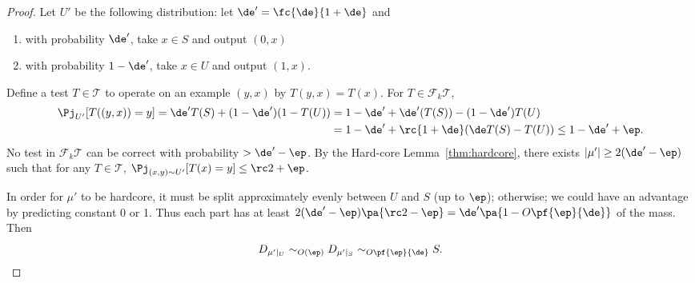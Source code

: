 \begin{proof}
Let $U'$ be the following distribution: let $\de'=\fc{\de}{1+\de}$ and 
\begin{enumerate}
\item
with probability $\de'$, take $x\in S$ and output $(0,x)$
\item
with probability $1-\de'$, take $x\in U$ and output $(1,x)$.
\end{enumerate}
Define a test $T\in \mathcal T$ to operate on an example $(y, x)$ by $T(y,x)=T(x)$. For $T\in \mathcal F_k \mathcal T$, 
\begin{align}
\Pj_{U'}[T((y,x))=y] = 
\de' T(S) + (1-\de') (1-T(U))
&= 1-\de' + \de' (T(S)) - (1-\de') T(U)\\
&= 1-\de' + \rc{1+\de} (\de T(S) - T(U))\le 1-\de'+\ep.
\end{align}
No test in $\mathcal F_k \mathcal T$ can be correct with probability $>\de'-\ep$. By the Hard-core Lemma~\ref{thm:hardcore}, there exists $|\mu'|\ge 2(\de'-\ep)$ such that for any $T\in \mathcal T$, $\Pj_{(x,y) \sim U'}[T(x)=y]\le  \rc2+\ep$.

In order for $\mu'$ to be hardcore, it must be split approximately evenly between $U$ and $S$ (up to $\ep$); otherwise; we could have an advantage by predicting constant 0 or 1. 
Thus each part has at least $2(\de'-\ep) \pa{\rc 2 - \ep} = \de'\pa{1-O\pf{\ep}{\de}}$ of the mass. Then
$$D_{\mu'|_U}\sim_{O(\ep)} D_{\mu'|_S}\sim_{O\pf{\ep}{\de}} S.$$
\end{proof}






